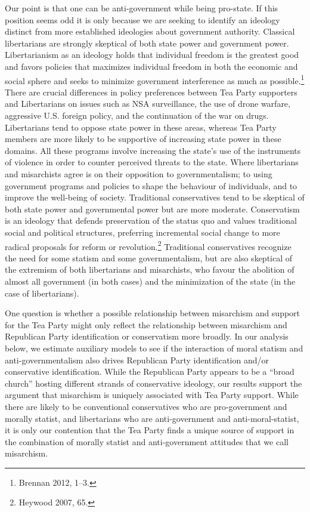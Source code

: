 \documentclass[12pt,]{article}
\begin{document}
Our point is that one can be anti-government while being pro-state. If
this position seems odd it is only because we are seeking to identify an
ideology distinct from more established ideologies about government
authority. Classical libertarians are strongly skeptical of both state
power and government power. Libertarianism as an ideology holds that
individual freedom is the greatest good and favors policies that
maximizes individual freedom in both the economic and social sphere and
seeks to minimize government interference as much as possible.\footnote{Brennan
  2012, 1--3. } There are crucial differences in policy preferences
between Tea Party supporters and Libertarians on issues such as NSA
surveillance, the use of drone warfare, aggressive U.S. foreign policy,
and the continuation of the war on drugs. Libertarians tend to oppose
state power in these areas, whereas Tea Party members are more likely to
be supportive of increasing state power in these domains. All these
programs involve increasing the state's use of the instruments of
violence in order to counter perceived threats to the state. Where
libertarians and misarchists agree is on their opposition to
governmentalism; to using government programs and policies to shape the
behaviour of individuals, and to improve the well-being of society.
Traditional conservatives tend to be skeptical of both state power and
governmental power but are more moderate. Conservatism is an ideology
that defends preservation of the status quo and values traditional
social and political structures, preferring incremental social change to
more radical proposals for reform or revolution.\footnote{Heywood 2007,
  65. } Traditional conservatives recognize the need for some statism
and some governmentalism, but are also skeptical of the extremism of
both libertarians and misarchists, who favour the abolition of almost
all government (in both cases) and the minimization of the state (in the
case of libertarians).

One question is whether a possible relationship between misarchism and
support for the Tea Party might only reflect the relationship between
misarchism and Republican Party identification or conservatism more
broadly. In our analysis below, we estimate auxiliary models to see if
the interaction of moral statism and anti-governmentalism also drives
Republican Party identification and/or conservative identification.
While the Republican Party appears to be a ``broad church'' hosting
different strands of conservative ideology, our results support the
argument that misarchism is uniquely associated with Tea Party support.
While there are likely to be conventional conservatives who are
pro-government and morally statist, and libertarians who are
anti-government and anti-moral-statist, it is only our contention that
the Tea Party finds a unique source of support in the combination of
morally statist and anti-government attitudes that we call misarchism.
\end{document}
